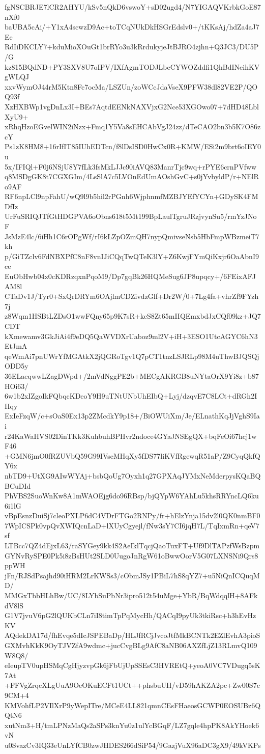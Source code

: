 fgNSCBRJE7lCR2AHYU/kSv5nQkD6vswoY+sD02ugd4/N7YIGAQVKrbkGoE87nXf0
baUBA5cAi/+Y1xA4scwzD9Ac+toTCqNUkDkHSGrEdslv0+/tKKsAj/hdZa4aJ7Ee
RdIiDKCLY7+kduMioXOuGt1brRYo3u3kRrdukyjeJtBJRO4zjhn+Q3JC3/DU5P/G
kz815BQdND+PY3SXV8U7oIPV/IXfAgmTODJLbeCYWOZddfi1QhBdINeihKVgWLQJ
xxvWymOJ44rM5Ktn8Fc7ocMa/LSZUn/zoWCcJdaVseX9PFW38dl82VE2P/QOQ93f
XzHXBWp1vgDnLx3I+BEs7AqtdEENkNAXVjxG2Nce53XGOwo07+7dHD48LblXyU9+
xRhqHzoEGvelWIN2iNzx+Fmq1Y5Va8sEHCAbVgJ24zz/dTeCAO2bn3b5K7O86zcY
Ps1zK8HM8+16rIfIT85IUhEDTcn/f8lDsISD0HwCx0R+KMW/ESi2m9brt6oIEY0u
5x/IFIQl+F0j6NSjU8Y7fLk3fsMkLJJc90iAVQ83ManrTjc9wq+rPYE6crnPVfww
q8MSDgGK8t7CGXGIm/4LsSlA7c5LVOnEdUmAOshGvC+s0jYvbyldP/r+NElRo9AF
RF6npLCl9npFahU/wQ9l9b5hil2rPGnh6WjphnmfMZBJYEfYCYn+GDySK4FMDfIz
UrFuSRIQJTfGtHDGPVA6oObns618t5Mt199BpLaulTgruJRzjvynSu5/rmYzJNoF
JsMzE4lc/6iHh1C6rOPgWf/rI6kLZpOZmQH7nypQmivseNsb5HbFmpWBzmeiT7kh
p/GiTZclv6FdNBXPfC8nF8vnIJiCQqTwQTeK3lY+Z6KwjFYmQiKxjr6OaAbnI9ce
EuObHwb04x0cKDRzqxnPqoM9/Dp7gqBk26HQMeSug6JP8upqcy+/6FEixAFJAM8l
CTaDv1J/Tyr0+SxQrDRYm6OAjlmCDZivdzGlf+Dr2W/0+7Lg4fa+vhrZf9FYzh7j
z8Wqm1HSBtLZDsO1wwFQny65p9K7sR+kcS8Zt65mIIQEmxbdJxCQf09kz+JQ7CDT
kXmewamv3GkJiAi4f9eDQ5QaWVDXrUaboz9ml2V+iH+3ESO1UtcAGYC6hN3EtJmA
qeWmAi7pnUWrYfMGAtkX2jQGRoTgv1Q7pCT1tnzLSJRLp98M4uThwBJQSQjODD5y
36ELaeqwwLZagDWpd+/2mVdNggPE2b+MECgAKRGB8uNYtaOrX9Yi8z+b87HOi63/
6w1b2xIZgoIkFQbqcKDeoY9H9uTNtUNbUhEIbQ+Lyj/dzqvE7C8LCt+dRGh2IHqy
ExIeFzqW/c+sOaS0Ex13p2ZMcdkY9p18+/BiOWUiXm/Je/ELnathKqJjVghS9Iai
r24KaWaHVS02DinTKk3KuhbuhBPHvr2ndoce4GYaJNSEgQX+bqFeOi67hcj1wF46
+GMN6jmO0fRZUVbQ59G99IVseMHqXy5fDS77liKVfRgewqR51aP/Z9CyqQkfQY6x
nbTD9+UtXG9AIwWYAj+bsbQoUg7Oyxh1q27GPXAqJYMxNeMderpysKQaBQBCuDId
PhVBS2SuoWnKw8A1mWAOEjg6do96RBsp/bjQYpW6YAhLu5khsRRYncLQ6ku6i1lG
vBpEsnzDuiSj7cleoPXLP6dC4VDrFTGo2RNPy/fr+hElzYnja15dv2l0QK0nmBF0
7WpICSPk0vpQvXWIQcnLaD+lXUyCgyejl/fNw3sY7CI6jqH7L/TqIxmRn+qeV7sf
LTBcc7QZ4dEjxL63/raSYGey9kk4S2AeIklTqcjQaoTuxFT+Uf9DlTAPzfWsBzpm
GYNvRySPE0Pk5i8zBsHUt2SLD0UugoJnRgW61oBwwOorV5G07LXNSNi9Qrs8ppWH
jFn/RJSdPsajhd90iHRM2LrKWSs3/cObmJSy1PBiL7hS8qYZ7+u5NiQnICQuqMD/
MMGxTbbHLhBw/UC/8LYbSuPbNr3ipro512t54uMge+YbR/BqWdqqlH+8AFkdV8lS
G1V7jvuV6pG2lQUKbCLn7iI8timTpPqMycHh/QACqI9pyUk3tkiRsc+h3hEvHzKV
AQdekDA17d/fhEvqe5dIcJSPEBaDp/HLJfRCjJvcoJtfMkBCNTk2EZlEvhA3pioS
GXMvhKkK9OyTJVZfA9wdmc+jucCvgBLg9AfC8aNB06AXZfLjZ13RLmvQ109W8Q8/
eIeupTV0upHSMqCgHjyzvpGk6jFbUjUpSSEsC3HVREtQ+yeoA0VC7VDugq5sK7At
+FFVgZrqcXLgUuA9OeOKuECFt1UCt++phsbuUH/vD59hAKZA2pc+Zw00S7c9CM+4
KMVohfLP2VIlXrP9yWepITre/MCeE4LL821qmnCEsFHaeosGCWP0EOSUBz6QQtN6
xutNm3+H/tmLPNzMaQs2aSPs3knYu0z1ulYcBGqF/LZ7gqle4hpPK8AkYHoek6vN
u0SvazCv3IQ33eUnLYfCB0zwJHDES266dSiP54/9GazjVuX96aDC3gX9/49kVKPs
